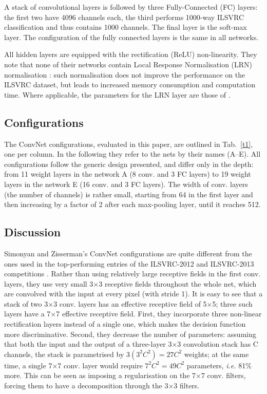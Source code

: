 \documentclass[10pt,twocolumn,letterpaper]{article}
\begin{document}
A stack of convolutional layers is followed by three Fully-Connected (FC) layers: the first two have 4096 channels each, the third performs 1000-way ILSVRC classification and thus contains 1000 channels. The final layer is the soft-max layer. The configuration of the fully connected layers is the same in all networks.

All hidden layers are equipped with the rectification (ReLU) non-linearity. They note that none of their networks contain Local Response Normalisation (LRN) normalisation \cite{Krizhevsky2012ImageNet}: such normalisation does not improve the performance on the ILSVRC dataset, but leads to increased memory consumption and computation time. Where applicable, the parameters for the LRN layer are those of \cite{Krizhevsky2012ImageNet}.


\subsection{Configurations}

The ConvNet configurations, evaluated in this paper, are outlined in Tab.~\ref{t1}, one per column. In the following they refer to the nets by their names (A–E). All configurations follow the generic design presented, and differ only in the depth: from 11 weight layers in the network A (8 conv. and 3 FC layers) to 19 weight layers in the network E (16 conv. and 3 FC layers). The width of conv. layers (the number of channels) is rather small, starting from 64 in the first layer and then increasing by a factor of 2 after each max-pooling layer, until it reaches 512.

\subsection{Discussion}

Simonyan and Zisserman's ConvNet configurations are quite different from the ones used in the top-performing entries of the ILSVRC-2012 \cite{Krizhevsky2012ImageNet} and ILSVRC-2013 competitions \cite{Zeiler2014Visualizing}. Rather than using relatively large receptive fields in the first conv. layers, they use very small 3$\times$3 receptive fields throughout the whole net, which are convolved with the input at every pixel (with stride 1). It is easy to see that a stack of two 3$\times$3 conv. layers has an effective receptive field of 5$\times$5; three such layers have a 7$\times$7 effective receptive field. First, they incorporate three non-linear rectification layers instead of a single one, which makes the decision function more discriminative. Second, they decrease the number of parameters: assuming that both the input and the output of a three-layer 3$\times$3 convolution stack has C channels, the stack is parametrised by $3(3^2C^2)= 27C^2$ weights; at the same time, a single 7$\times$7 conv. layer would require $7^2C^2 = 49C^2$ parameters, \emph{i.e.} 81\% more. This can be seen as imposing a regularisation on the 7$\times$7 conv. filters, forcing them to have a decomposition through the 3$\times$3 filters.


{\small


}
\end{document}
